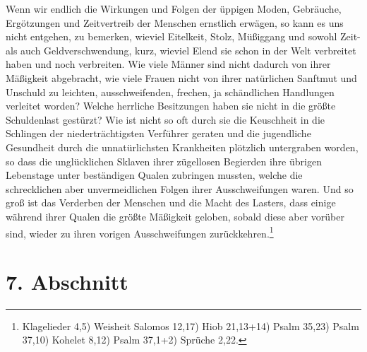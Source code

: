 \medskip

Wenn wir endlich die Wirkungen und Folgen der üppigen Moden, Gebräuche,
Ergötzungen und Zeitvertreib der Menschen ernstlich erwägen, so kann es uns
nicht entgehen, zu bemerken, wieviel Eitelkeit, Stolz, Müßiggang und sowohl
Zeit- als auch Geldverschwendung, kurz, wieviel Elend sie schon in der Welt
verbreitet haben und noch verbreiten. Wie viele Männer sind nicht dadurch von
ihrer Mäßigkeit abgebracht, wie viele Frauen nicht von ihrer natürlichen
Sanftmut und Unschuld zu leichten, ausschweifenden, frechen, ja schändlichen
Handlungen verleitet worden? Welche herrliche Besitzungen haben sie nicht in die
größte Schuldenlast gestürzt? Wie ist nicht so oft durch sie die Keuschheit in
die Schlingen der niederträchtigsten Verführer geraten und die jugendliche
Gesundheit durch die unnatürlichsten Krankheiten plötzlich untergraben worden,
so dass die unglücklichen Sklaven ihrer zügellosen
Begierden ihre
übrigen
Lebenstage unter beständigen Qualen zubringen mussten, welche die schrecklichen
aber unvermeidlichen Folgen ihrer Ausschweifungen waren. Und so groß ist das
Verderben der Menschen und die Macht des Lasters, dass einige während ihrer
Qualen die größte Mäßigkeit geloben, sobald diese aber vorüber sind, wieder zu
ihren vorigen Ausschweifungen zurückkehren.\footnote{
Klagelieder 4,5)
Weisheit Salomos 12,17)
Hiob 21,13+14)
Psalm 35,23)
Psalm 37,10)
Kohelet 8,12)
Psalm 37,1+2)
Sprüche 2,22.}

\section{7. Abschnitt} \label{kap18_ab7}

